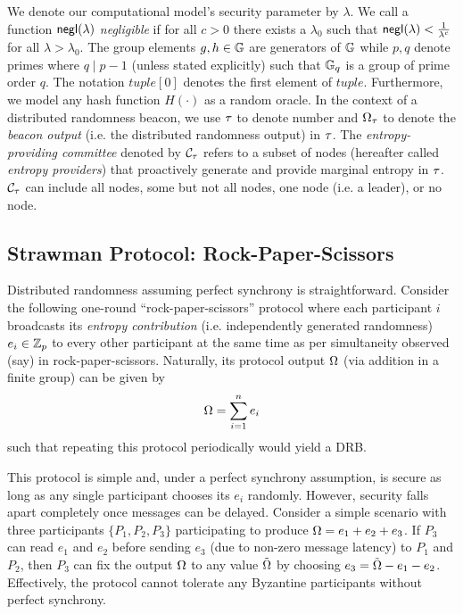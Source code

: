 We denote our computational model's security parameter by $\lambda$. We call a function $\mathsf{negl}(\lambda)$ \textit{negligible} if for all $c > 0$ there exists a $\lambda_0$ such that $\mathsf{negl}(\lambda) < \frac{1}{\lambda^c}$ for all $\lambda > \lambda_0$. The group elements $g, h \in \mathbb{G}$ are generators of $\mathbb{G}$ while $p, q$ denote primes where $q \mid p - 1$ (unless stated explicitly) such that $\mathbb{G}_q$ is a group of prime order $q$. The notation $tuple[0]$ denotes the first element of $tuple$. Furthermore, we model any hash function $H(\cdot)$ as a random oracle. In the context of a distributed randomness beacon, we use $\tau$ to denote \epoch number and $\Omega_\tau$ to denote the \textit{beacon output} (i.e. the distributed randomness output) in \epoch $\tau$. The \textit{entropy-providing committee} denoted by $\mathcal{C}_\tau$ refers to a subset of nodes (hereafter called \textit{entropy providers}) that proactively generate and provide marginal entropy in \epoch $\tau$. $\mathcal{C}_\tau$ can include all nodes, some but not all nodes, one node (i.e. a leader), or no node.

\subsection{Strawman Protocol: Rock-Paper-Scissors}
Distributed randomness assuming perfect synchrony is straightforward. Consider the following one-round ``rock-paper-scissors'' protocol where each participant $i$ broadcasts its \textit{entropy contribution} (i.e. independently generated randomness) $e_i \in \mathbb{Z}_p$ to every other participant at the same time as per simultaneity observed (say) in rock-paper-scissors. Naturally, its protocol output $\Omega$ (via addition in a finite group) can be given by
\begin{equation}
\label{equation:addall}
\drboutput = \sum_{i = 1}^n e_i
\end{equation}
such that repeating this protocol periodically would yield a DRB.

This protocol is simple and, under a perfect synchrony assumption, is secure as long as any single participant chooses its $e_i$ randomly. However, security falls apart completely once messages can be delayed.
Consider a simple scenario with three participants $\{P_1, P_2, P_3\}$ participating to produce $\Omega = e_1 + e_2 + e_3$. If $P_3$ can read $e_1$ and $e_2$ before sending $e_3$ (due to non-zero message latency) to $P_1$ and $P_2$, then $P_3$ can fix the output $\Omega$ to any value $\tilde{\Omega}$ by choosing $e_3 = \tilde{\Omega} - e_1 - e_2$. Effectively, the protocol cannot tolerate any Byzantine participants without perfect synchrony.

